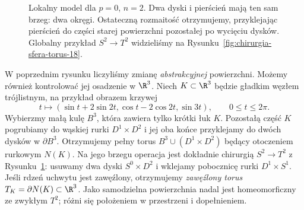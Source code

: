 \begin{figure}[htbp]
\centering
{}
\caption{Lokalny model dla $p=0$, $n=2$.
Dwa dyski i pierścień mają ten sam brzeg: dwa okręgi.
Ostateczną rozmaitość otrzymujemy, przyklejając
pierścień do części starej powierzchni pozostałej
po wycięciu dysków. Globalny przykład $S^2\to T^2$
widzieliśmy na Rysunku~\ref{fig:chirurgia-sfera-torus-18}.}
\label{fig:krok-chirurgii-21}
\end{figure}

\begin{przyklad}
\label{prz:knotted-torus-surgery-21}
W poprzednim rysunku liczyliśmy zmianę
\emph{abstrakcyjnej} powierzchni. Możemy
również kontrolować jej osadzenie w $\R^3$.
Niech $K\subset\R^3$ będzie gładkim węzłem
trójlistnym, na przykład obrazem krzywej
\[
 t\longmapsto(\sin t+2\sin2t,
 \cos t-2\cos2t,\sin3t),
 \qquad 0\leq t\leq2\pi.
\]
Wybierzmy małą kulę $B^3$, która zawiera
tylko krótki łuk $K$. Pozostałą część $K$
pogrubiamy do wąskiej rurki $D^1\times D^2$
i jej oba końce przyklejamy do dwóch dysków
w $\partial B^3$. Otrzymujemy pełny torus
$B^3\cup(D^1\times D^2)$ będący otoczeniem
rurkowym $N(K)$. Na jego brzegu operacja jest
dokładnie chirurgią $S^2\to T^2$ z
Rysunku~\ref{fig:krok-chirurgii-21}:
usuwamy dwa dyski $S^0\times D^2$
i wklejamy pobocznicę rurki $D^1\times S^1$.
Jeśli rdzeń uchwytu jest zawęźlony,
otrzymujemy \emph{zawęźlony torus}
$T_K=\partial N(K)\subset\R^3$.
Jako samodzielna powierzchnia nadal jest
homeomorficzny ze zwykłym $T^2$; różni się
położeniem w przestrzeni i dopełnieniem.
\end{przyklad}

